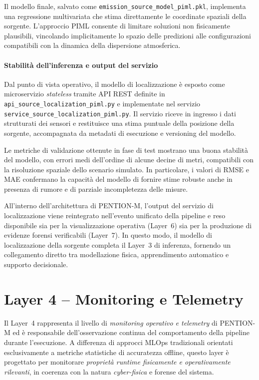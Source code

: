 Il modello finale, salvato come \texttt{emission\_source\_model\_piml.pkl}, implementa una regressione multivariata che stima direttamente le coordinate spaziali della sorgente.
L’approccio PIML consente di limitare soluzioni non fisicamente plausibili, vincolando implicitamente lo spazio delle predizioni alle configurazioni compatibili con la dinamica della dispersione atmosferica.

\paragraph{Stabilità dell’inferenza e output del servizio}

Dal punto di vista operativo, il modello di localizzazione è esposto come microservizio \textit{stateless} tramite API REST definite in \texttt{api\_source\_localization\_piml.py} e implementate nel servizio \texttt{service\_source\_localization\_piml.py}.
Il servizio riceve in ingresso i dati strutturati dei sensori e restituisce una stima puntuale della posizione della sorgente, accompagnata da metadati di esecuzione e versioning del modello.

Le metriche di validazione ottenute in fase di test mostrano una buona stabilità del modello, con errori medi dell’ordine di alcune decine di metri, compatibili con la risoluzione spaziale dello scenario simulato.
In particolare, i valori di RMSE e MAE confermano la capacità del modello di fornire stime robuste anche in presenza di rumore e di parziale incompletezza delle misure.

All’interno dell’architettura di \textsc{PENTION-M}, l’output del servizio di localizzazione viene reintegrato nell’evento unificato della pipeline e reso disponibile sia per la visualizzazione operativa (Layer~6) sia per la produzione di evidenze forensi verificabili (Layer~7).
In questo modo, il modello di localizzazione della sorgente completa il Layer~3 di inferenza, fornendo un collegamento diretto tra modellazione fisica, apprendimento automatico e supporto decisionale.

\section{Layer 4 -- Monitoring e Telemetry}
\label{sec:layer4_monitoring}

Il Layer~4 rappresenta il livello di \emph{monitoring operativo e telemetry} di \textsc{PENTION-M} ed è responsabile dell’osservazione continua del comportamento della pipeline durante l’esecuzione.
A differenza di approcci MLOps tradizionali orientati esclusivamente a metriche statistiche di accuratezza offline, questo layer è progettato per monitorare \emph{proprietà runtime fisicamente e operativamente rilevanti}, in coerenza con la natura \textit{cyber-fisica} e forense del sistema.


